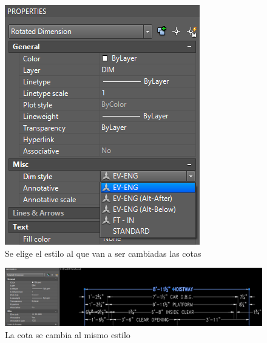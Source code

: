 \documentclass[12pt,letterpaper,final]{report}
\begin{document}
\begin{figure}[H]
	\centering
	\includegraphics[width=0.85\linewidth, height=0.5\textheight,keepaspectratio]{Imagenes/apendice_anotative_09}
	\caption{Se elige el estilo al que van a ser cambiadas las cotas}
	\label{fig:apendiceanotative09}
\end{figure}

\begin{figure}[H]
	\centering
	\includegraphics[width=0.95\linewidth, height=0.5\textheight,keepaspectratio]{Imagenes/apendice_anotative_10}
	\caption{La cota se cambia al mismo estilo}
	\label{fig:apendiceanotative10}
\end{figure}
\end{document}
